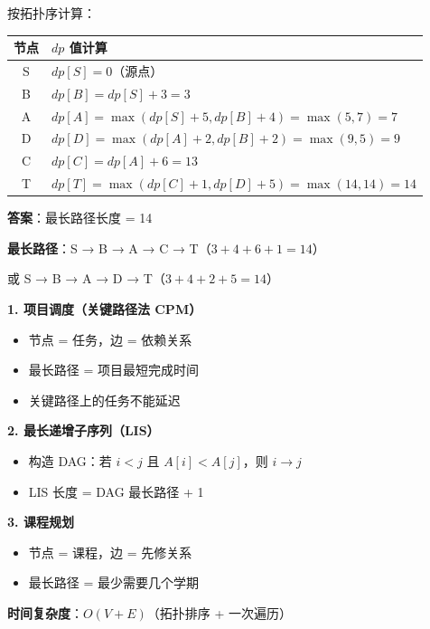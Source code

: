 \documentclass[12pt, a4paper]{ctexart}
\begin{document}
\begin{blackboard}

按拓扑序计算：

\begin{center}
\begin{tabular}{c|l}
节点 & $dp$ 值计算 \\
\hline
S & $dp[S] = 0$（源点） \\
B & $dp[B] = dp[S] + 3 = 3$ \\
A & $dp[A] = \max(dp[S] + 5, dp[B] + 4) = \max(5, 7) = 7$ \\
D & $dp[D] = \max(dp[A] + 2, dp[B] + 2) = \max(9, 5) = 9$ \\
C & $dp[C] = dp[A] + 6 = 13$ \\
T & $dp[T] = \max(dp[C] + 1, dp[D] + 5) = \max(14, 14) = 14$ \\
\end{tabular}
\end{center}

\textbf{答案}：最长路径长度 = 14

\textbf{最长路径}：S → B → A → C → T（$3+4+6+1=14$）

或 S → B → A → D → T（$3+4+2+5=14$）

\end{blackboard}

\begin{blackboard}

\textbf{1. 项目调度（关键路径法 CPM）}
\begin{itemize}
    \item 节点 = 任务，边 = 依赖关系
    \item 最长路径 = 项目最短完成时间
    \item 关键路径上的任务不能延迟
\end{itemize}

\textbf{2. 最长递增子序列（LIS）}
\begin{itemize}
    \item 构造 DAG：若 $i < j$ 且 $A[i] < A[j]$，则 $i \to j$
    \item LIS 长度 = DAG 最长路径 + 1
\end{itemize}

\textbf{3. 课程规划}
\begin{itemize}
    \item 节点 = 课程，边 = 先修关系
    \item 最长路径 = 最少需要几个学期
\end{itemize}

\textbf{时间复杂度}：$O(V + E)$（拓扑排序 + 一次遍历）

\end{blackboard}
\end{document}

